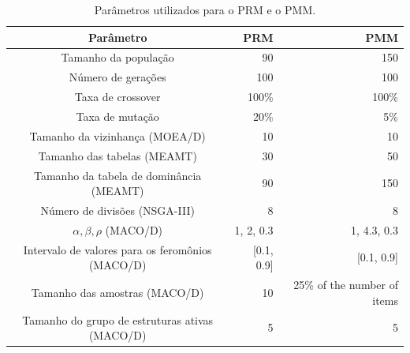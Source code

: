 \begin{table}[!htbp]
	\caption{Parâmetros utilizados para o PRM e o PMM.}
	\label{table_exp2_parametros}
	\begin{center}
		\begin{tabular}{c|r|r}
			\textbf{Parâmetro} & \textbf{PRM} &  \textbf{PMM} \\ %
			\hline
			Tamanho da população               &    90 &      150 \\ %
			Número de gerações        &   100 &      100 \\ %
			Taxa de crossover                & 100\% &    100\% \\ %
			Taxa de mutação                 &  20\% &      5\% \\ %
			Tamanho da vizinhança (MOEA/D)    &    10 &       10 \\ %
			Tamanho das tabelas (MEAMT)   &    30 &       50 \\ %
			Tamanho da tabela de dominância (MEAMT) &    90 &      150 \\ %
			Número de divisões (NSGA-III)&     8 &        8 \\ %
			$\alpha, \beta, \rho$ (MACO/D)& 1, 2, 0.3 & 1, 4.3, 0.3 \\ %
			Intervalo de valores para os feromônios (MACO/D)& [0.1, 0.9] & [0.1, 0.9] \\ %
			Tamanho das amostras (MACO/D)& 10 &25\% of the number of items \\  %
			Tamanho do grupo de estruturas ativas (MACO/D)& 5 & 5 \\
			\hline
		\end{tabular}
	\end{center}
\end{table}

